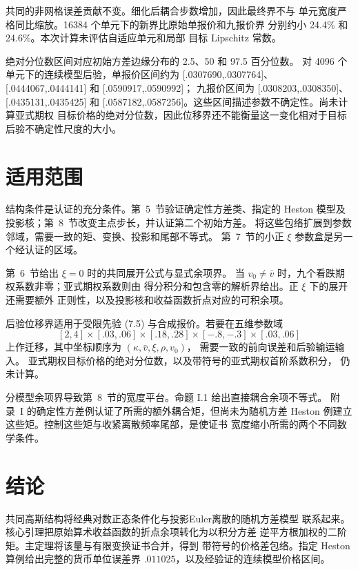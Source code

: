 共同的非网格误差贡献不变。细化后耦合步数增加，因此最终界不与
单元宽度严格同比缩放。16384 个单元下的新界比原始单报价和九报价界
分别约小 24.4\% 和 24.6\%。本次计算未评估自适应单元和局部
目标 Lipschitz 常数。

绝对分位数区间对应初始方差边缘分布的 2.5、50 和 97.5 百分位数。
对 4096 个单元下的连续模型后验，单报价区间约为
[.0307690,.0307764]、[.0444067,.0444141] 和 [.0590917,.0590992]；
九报价区间为 [.0308203,.0308350]、[.0435131,.0435425] 和
[.0587182,.0587256]。这些区间描述参数不确定性。尚未计算亚式期权
目标价格的绝对分位数，因此位移界还不能衡量这一变化相对于目标
后验不确定性尺度的大小。


\section{适用范围}

结构条件是认证的充分条件。第~5~节验证确定性方差类、指定的
Heston 模型及投影核；第~8~节改变主点步长，并认证第二个初始方差。
将这些包络扩展到参数邻域，需要一致的矩、变换、投影和尾部不等式。
第~7~节的小正 \(\xi\) 参数盒是另一个经认证的区域。

第~6~节给出 \(\xi=0\) 时的共同展开公式与显式余项界。
当 \(v_0\ne\bar v\) 时，九个看跌期权系数非零；亚式期权系数则由
得分积分和包含零的解析界给出。正 \(\xi\) 下的展开还需要额外
正则性，以及投影核和收益函数折点对应的可积余项。

后验位移界适用于受限先验 (7.5) 与合成报价。若要在五维参数域
\[
[2,4]\times[.03,.06]\times[.18,.28]\times[-.8,-.3]\times[.03,.06]
\]
上作迁移，其中坐标顺序为 \((\kappa,\bar v,\xi,\rho,v_0)\)，
需要一致的前向误差和后验输运输入。
亚式期权目标价格的绝对分位数，以及带符号的亚式期权首阶系数积分，
仍未计算。

分模型余项界导致第~8~节的宽度平台。命题 I.1 给出直接耦合余项不等式。
附录~I 的确定性方差例认证了所需的额外耦合矩，但尚未为随机方差
Heston 例建立这些矩。控制这些矩与收紧离散频率尾部，是使证书
宽度缩小所需的两个不同数学条件。

\section{结论}

共同高斯结构将经典对数正态条件化与投影Euler离散的随机方差模型
联系起来。核心引理把原始算术收益函数的折点余项转化为以积分方差
逆平方根加权的二阶矩。主定理将该量与有限变换证书合并，得到
带符号的价格差包络。指定 Heston 算例给出完整的货币单位误差界
\(.011025\)，以及经验证的连续模型价格区间。

